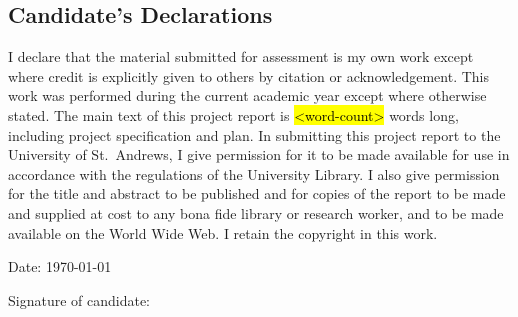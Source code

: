 %
%

\begin{declaration}
\subsection*{Candidate's Declarations}

I declare that the material submitted for assessment is my own work except where credit is explicitly given to others by citation or acknowledgement. This work was performed during the current academic year except where otherwise stated.
The main text of this project report is \hl{<word-count>} words long, including project specification and plan. In submitting this project report to the University of St.\ Andrews, I give permission for it to be made available for use in accordance with the regulations of the University Library. I also give permission for the title and abstract to be published and for copies of the report to be made and supplied at cost to any bona fide library or research worker, and to be made available on the World Wide Web. I retain the copyright in this work.

\vspace{24pt}

Date: \today
\vspace{16pt}

Signature of candidate:
\vspace{48pt}

\end{declaration}